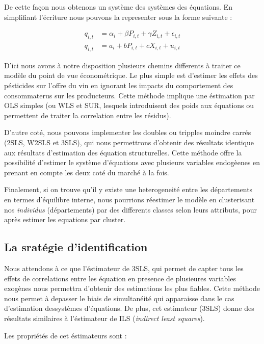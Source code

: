\documentclass[11pt,]{article}
\begin{document}
De cette façon nous obtenons un système des systèmes des équations. En
simplifiant l'écriture nous pouvons la representer sous la forme
suivante :

\begin{align*}
  q_{i,t} & = \alpha_{i} + \beta P_{i,t} + \gamma Z_{i,t} + \epsilon_{i,t} \\
  q_{i,t} & = a_i + b P_{i,t} + c X_{i,t} + u_{i,t}
\end{align*}

D'ici nous avons à notre disposition plusieurs chemins differents à
traiter ce modèle du point de vue économétrique. Le plus simple est
d'estimer les effets des pésticides sur l'offre du vin en ignorant les
impacts du comportement des consommaterus sur les producteurs. Cette
méthode implique une éstimation par OLS simples (ou WLS et SUR, lesquels
introduisent des poids aux équations ou permettent de traiter la
correlation entre les résidus).

D'autre coté, nous pouvons implementer les doubles ou tripples moindre
carrés (2SLS, W2SLS et 3SLS), qui nous permettrons d'obtenir des
résultats identique aux résultats d'estimation des équation
structurelles. Cette méthode offre la possibilité d'estimer le système
d'équations avec plusieurs variables endogèenes en prenant en compte les
deux coté du marché à la fois.

Finalement, si on trouve qu'il y existe une heterogeneité entre les
départements en termes d'équilibre interne, nous pourrions réestimer le
modèle en clusterisant nos \emph{individus} (départements) par des
differents classes selon leurs attributs, pour après estimer les
equations par cluster.

\hypertarget{la-srategie-didentification}{%
\subsection{La sratégie
d'identification}\label{la-srategie-didentification}}

Nous attendons à ce que l'éstimateur de 3SLS, qui permet de capter tous
les effets de correlations entre les équation en presence de plusieures
variables exogènes nous permettra d'obtenir des estimations les plus
fiables. Cette méthode nous permet à depasser le biais de simultanéité
qui apparaisse dans le cas d'estimation dessystèmes d'équations. De
plus, cet estimateur (3SLS) donne des résultats similaires à
l'éstimateur de ILS (\emph{indirect least squares}).

Les propriétés de cet éstimateurs sont :
\end{document}
